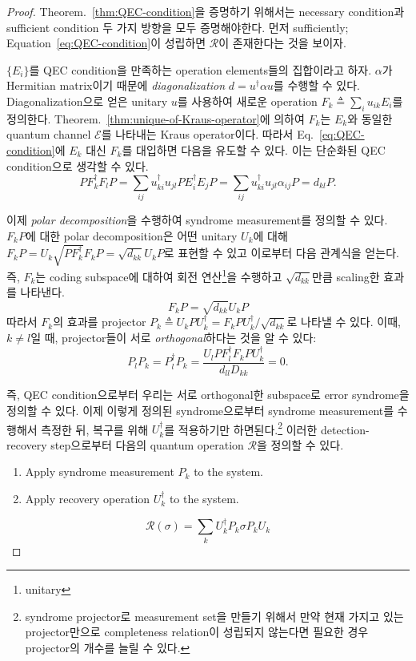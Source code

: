 \begin{proof}
    Theorem.~\ref{thm:QEC-condition}을 증명하기 위해서는 necessary condition과 sufficient condition 두 가지 방향을 모두 증명해야한다. 먼저 sufficiently; Equation~\eqref{eq:QEC-condition}이 성립하면 $\mathcal R$이 존재한다는 것을 보이자. 
    
    \pagebreak
    $\{E_i\}$를 QEC condition을 만족하는 operation elements들의 집합이라고 하자. $\alpha$가 Hermitian matrix이기 때문에 \textit{diagonalization} $d = u^\dagger \alpha u$를 수행할 수 있다. Diagonalization으로 얻은 unitary $u$를 사용하여 새로운 operation $F_k \triangleq \sum_i u_{ik}E_i$를 정의한다.
    Theorem.~\ref{thm:unique-of-Kraus-operator}에 의하여 $F_k$는 $E_k$와 동일한 quantum channel $\mathcal E$를 나타내는 Kraus operator이다. 따라서 Eq.~\eqref{eq:QEC-condition}에 $E_k$ 대신 $F_k$를 대입하면 다음을 유도할 수 있다. 이는 단순화된 QEC condition으로 생각할 수 있다.
    \begin{equation*}
        P F_k^{\dagger} F_l P=\sum_{i j} u_{k i}^{\dagger} u_{j l} P E_i^{\dagger} E_j P=\sum_{i j} u_{k i}^{\dagger} u_{j l} \alpha_{i j} P=d_{k l} P .
    \end{equation*}
    
    이제 \textit{polar decomposition}을 수행하여 syndrome measurement를 정의할 수 있다. $F_kP$에 대한 polar decomposition은 어떤 unitary $U_k$에 대해 $F_k P=U_k \sqrt{P F_k^{\dagger}} F_k P=\sqrt{d_{k k}} U_k P$로 표현할 수 있고 이로부터 다음 관계식을 얻는다. 즉, $F_k$는 coding subspace에 대하여 회전 연산\footnote{unitary}을 수행하고 $\sqrt{d_{kk}}$만큼 scaling한 효과를 나타낸다.
    \begin{equation*}
        F_k P = \sqrt{d_{k k}} U_k P
    \end{equation*}
    따라서 $F_k$의 효과를 projector $P_k \triangleq U_k P U_k^\dagger = F_k P U_k^\dagger / \sqrt{d_{kk}}$로 나타낼 수 있다. 이때, $k \ne l$일 때, projector들이 서로 \textit{orthogonal}하다는 것을 알 수 있다:
    \begin{equation*}
        P_l P_k=P_l^{\dagger} P_k=\frac{U_l P F_l^{\dagger} F_k P U_k^{\dagger}}{d_{l l} D_{k k}}=0.
    \end{equation*}
    
    즉, QEC condition으로부터 우리는 서로 orthogonal한 subspace로 error syndrome을 정의할 수 있다. 이제 이렇게 정의된 syndrome으로부터 syndrome measurement를 수행해서 측정한 뒤, 복구를 위해 $U_k^\dagger$를 적용하기만 하면된다.\footnote{syndrome projector로 measurement set을 만들기 위해서 만약 현재 가지고 있는 projector만으로 completeness relation이 성립되지 않는다면 필요한 경우 projector의 개수를 늘릴 수 있다.} 이러한 detection-recovery step으로부터 다음의 quantum operation $\mathcal R$을 정의할 수 있다.
    \begin{enumerate}
        \item Apply syndrome measurement $P_k$ to the system.
        \item Apply recovery operation $U_k^\dagger$ to the system.
    \end{enumerate}
    \begin{equation*}
        \mathcal{R}(\sigma)=\sum_k U_k^{\dagger} P_k \sigma P_k U_k
    \end{equation*}


\end{proof}
